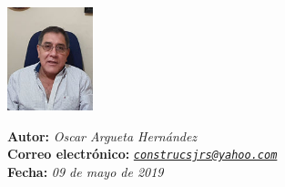 \documentclass[11pt,spanish,Letterpaper,openany]{book}
\begin{document}
\begin {flushleft}

\begin{tcolorbox}[sharp corners=uphill, colback=fondo, colframe=fondo, arc=6mm, boxrule=0mm, boxsep=2mm,  opacityframe=0.19,  opacityback=0.19]

\begin{minipage}[c]{3cm}

\includegraphics[width=2.5cm,height=\textheight]{images/201901-oargueta-photo.jpg}

\end{minipage}\begin{minipage}[c]{12cm}

\textbf{Autor:} \emph{Oscar Argueta Hernández}\\
\textbf{Correo electrónico:} \emph{\href{mailto:construcsjrs@yahoo.com}{\nolinkurl{construcsjrs@yahoo.com}}}\\
\textbf{Fecha:} \emph{09 de mayo de 2019}

\end{minipage}

\end {tcolorbox}

\end {flushleft}
\end{document}
